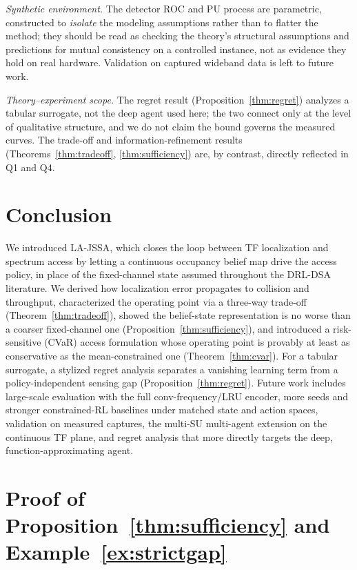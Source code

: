 \documentclass[journal]{IEEEtran}
\begin{document}
\emph{Synthetic environment.} The detector ROC and PU process are parametric,
constructed to \emph{isolate} the modeling assumptions rather than to flatter
the method; they should be read as checking the theory's structural
assumptions and predictions for mutual consistency on a controlled instance,
not as evidence they hold on real hardware. Validation on captured wideband
data is left to future work.

\emph{Theory--experiment scope.} The regret result
(Proposition~\ref{thm:regret}) analyzes a tabular surrogate, not the deep agent
used here; the two connect only at the level of qualitative structure, and we
do not claim the bound governs the measured curves. The trade-off and
information-refinement results
(Theorems~\ref{thm:tradeoff}, \ref{thm:sufficiency}) are, by contrast,
directly reflected in Q1 and Q4.


\section{Conclusion}
\label{sec:conclusion}

We introduced LA-JSSA, which closes the loop between TF localization and
spectrum access by letting a continuous occupancy belief map drive the access
policy, in place of the fixed-channel state assumed throughout the DRL-DSA
literature. We derived how localization error propagates to collision and
throughput, characterized the operating point via a three-way trade-off
(Theorem~\ref{thm:tradeoff}), showed the belief-state representation is no
worse than a coarser fixed-channel one (Proposition~\ref{thm:sufficiency}),
and introduced a risk-sensitive (CVaR) access formulation whose operating
point is provably at least as conservative as the mean-constrained one
(Theorem~\ref{thm:cvar}). For a tabular surrogate, a stylized regret analysis
separates a vanishing learning term from a policy-independent sensing gap
(Proposition~\ref{thm:regret}). Future work includes large-scale evaluation with
the full conv-frequency/LRU encoder, more seeds and stronger constrained-RL
baselines under matched state and action spaces, validation on measured
captures, the multi-SU multi-agent extension on the continuous TF plane, and
regret analysis that more directly targets the deep, function-approximating
agent.
\appendices
\section{Proof of Proposition~\ref{thm:sufficiency} and Example~\ref{ex:strictgap}}
\label{sec:appendix_suff}
\end{document}

